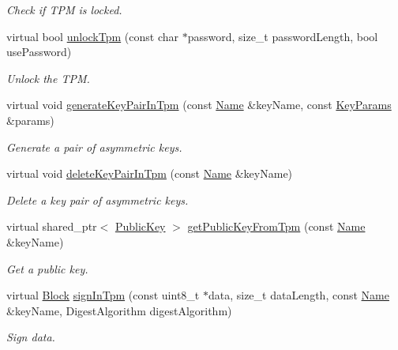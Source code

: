\begin{DoxyCompactItemize}
\begin{DoxyCompactList}\small\item\em Check if T\+PM is locked. \end{DoxyCompactList}\item 
virtual bool \hyperlink{classndn_1_1security_1_1DummyTpm_a64d94b723dd07ae671e55b8b310d288f}{unlock\+Tpm} (const char $\ast$password, size\+\_\+t password\+Length, bool use\+Password)
\begin{DoxyCompactList}\small\item\em Unlock the T\+PM. \end{DoxyCompactList}\item 
virtual void \hyperlink{classndn_1_1security_1_1DummyTpm_a6ced9181641854c9c0ac4758e792f7f5}{generate\+Key\+Pair\+In\+Tpm} (const \hyperlink{classndn_1_1Name}{Name} \&key\+Name, const \hyperlink{classndn_1_1KeyParams}{Key\+Params} \&params)
\begin{DoxyCompactList}\small\item\em Generate a pair of asymmetric keys. \end{DoxyCompactList}\item 
virtual void \hyperlink{classndn_1_1security_1_1DummyTpm_a71831f205209ea44b3bf536d67a53ed1}{delete\+Key\+Pair\+In\+Tpm} (const \hyperlink{classndn_1_1Name}{Name} \&key\+Name)
\begin{DoxyCompactList}\small\item\em Delete a key pair of asymmetric keys. \end{DoxyCompactList}\item 
virtual shared\+\_\+ptr$<$ \hyperlink{classndn_1_1PublicKey}{Public\+Key} $>$ \hyperlink{classndn_1_1security_1_1DummyTpm_a77b7c5e18dcaf42c47cea99d7003c0c8}{get\+Public\+Key\+From\+Tpm} (const \hyperlink{classndn_1_1Name}{Name} \&key\+Name)
\begin{DoxyCompactList}\small\item\em Get a public key. \end{DoxyCompactList}\item 
virtual \hyperlink{classndn_1_1Block}{Block} \hyperlink{classndn_1_1security_1_1DummyTpm_aab65a322fad9b19c70f9fdb028db6c16}{sign\+In\+Tpm} (const uint8\+\_\+t $\ast$data, size\+\_\+t data\+Length, const \hyperlink{classndn_1_1Name}{Name} \&key\+Name, Digest\+Algorithm digest\+Algorithm)
\begin{DoxyCompactList}\small\item\em Sign data. \end{DoxyCompactList}\item 

\end{DoxyCompactItemize}
